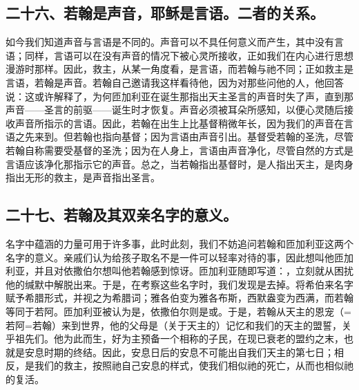 
\subsection{二十六、若翰是声音，耶稣是言语。二者的关系。}

如今我们知道声音与言语是不同的。声音可以不具任何意义而产生，其中没有言语；同样，言语可以在没有声音的情况下被心灵所接收，正如我们在内心进行思想漫游时那样。因此，救主，从某一角度看，是言语，而若翰与祂不同；正如救主是言语，若翰是声音。若翰自己邀请我这样看待他，因为对那些问他的人，他回答说：这或许解释了，为何匝加利亚在诞生那指出天主圣言的声音时失了声，直到那声音——圣言的前驱——诞生时才恢复。声音必须被耳朵所感知，以便心灵随后接收声音所指示的言语。因此，若翰在出生上比基督稍微年长，因为我们的声音在言语之先来到。但若翰也指向基督；因为言语由声音引出。基督受若翰的圣洗，尽管若翰自称需要受基督的圣洗；因为在人身上，言语由声音净化，尽管自然的方式是言语应该净化那指示它的声音。总之，当若翰指出基督时，是人指出天主，是肉身指出无形的救主，是声音指出圣言。\par


\subsection{二十七、若翰及其双亲名字的意义。}

名字中蕴涵的力量可用于许多事，此时此刻，我们不妨追问若翰和匝加利亚这两个名字的意义。亲戚们认为给孩子取名不是一件可以轻率对待的事，因此想叫他匝加利亚，并且对依撒伯尔想叫他若翰感到惊讶。匝加利亚随即写道：，立刻就从困扰他的缄默中解脱出来。于是，在考察这些名字时，我们发现是去掉。将希伯来名字赋予希腊形式，并视之为希腊词；雅各伯变为雅各布斯，西默盎变为西满，而若翰等同于若阿。匝加利亚被认为是，依撒伯尔则是或。于是，若翰从天主的恩宠（=若阿=若翰）来到世界，他的父母是（关于天主的）记忆和我们的天主的盟誓，关乎祖先们。他为此而生，好为主预备一个相称的子民，在现已衰老的盟约之末，也就是安息时期的终结。因此，安息日后的安息不可能出自我们天主的第七日；相反，是我们的救主，按照祂自己安息的样式，使我们相似祂的死亡，从而也相似祂的复活。\par

